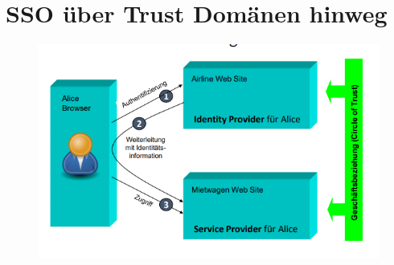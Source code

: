 \section{SSO über Trust Domänen hinweg}
\begin{figure}[H]
	\begin{center}
		\includegraphics[scale=0.8]{Resources/SSO}
		\caption{}
		\label{fig:SSO}
	\end{center}
\end{figure}

